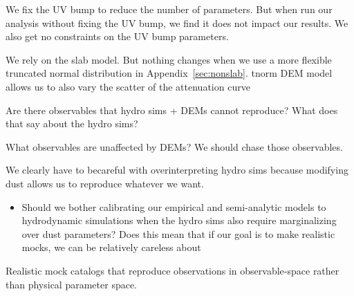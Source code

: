 We fix the UV bump to reduce the number of parameters. But when run our
analysis without fixing the UV bump, we find it does not impact our results.
We also get no constraints on the UV bump parameters. 

We rely on the slab model. But nothing changes when we use a more flexible
truncated normal distribution in Appendix~\ref{sec:nonslab}. tnorm DEM model allows us to also vary the
scatter of the attenuation curve 



Are there observables that hydro sims + DEMs cannot reproduce? What does that say about the hydro sims?

What observables are unaffected by DEMs? We should chase those observables. 

We clearly have to becareful with overinterpreting hydro sims because modifying
dust allows us to reproduce whatever we want. 
\begin{itemize}
    \item Should we bother calibrating our empirical and semi-analytic models
        to hydrodynamic simulations when the hydro sims also require
        marginalizing over dust parameters? Does this mean that if our goal is
        to make realistic mocks, we can be relatively careless about 
\end{itemize}


Realistic mock catalogs that reproduce observations in observable-space rather
than physical parameter space.  

